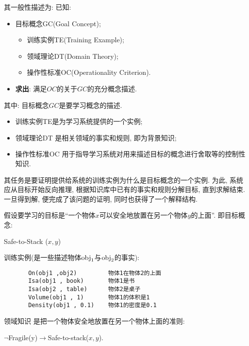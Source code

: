 其一般性描述为: 已知:
\begin{itemize}
\item 目标概念GC(Goal Concept);
   \begin{itemize}
         \item 训练实例TE(Training Example);
         \item 领域理论DT(Domain Theory);
         \item 操作性标准OC(Operationality Criterion).
   \end{itemize}
\item \textbf{求出}: 满足$OC$的关于$GC$的充分概念描述.
\end{itemize}
其中: 目标概念$GC$是要学习概念的描述.

\begin{itemize}
\item 训练实例TE是为学习系统提供的一个实例;
\item 领域理论DT 是相关领域的事实和规则, 即为背景知识;
\item 操作性标准OC 用于指导学习系统对用来描述目标的概念进行舍取等的控制性知识.
\end{itemize}

其任务是要证明提供给系统的训练实例为什么是目标概念的一个实例. 为此, 系统应从目标开始反向推理, 根据知识库中已有的事实和规则分解目标, 直到求解结束. 一旦得到解, 便完成了该问题的证明, 同时也获得了一个解释结构.

\begin{example}
假设要学习的目标是“一个物体$x$可以安全地放置在另一个物体$y$的上面”. 即目标概念:
\begin{center}
  Safe-to-Stack ($x, y$)
\end{center}

训练实例(是一些描述物体$\textup{obj}_1$与$\textup{obj}_2$的事实):
\begin{Verbatim}
       On(obj1 ,obj2)         物体1在物体2的上面
       Isa(obj1 , book)       物体1是书
       Isa(obj2 , table)      物体2是桌子
       Volume(obj1 , 1)       物体1的体积是1
       Density(obj1 , 0.1)    物体1的密度是0.1
\end{Verbatim}

领域知识   是把一个物体安全地放置在另一个物体上面的准则:
\begin{center}
  $\neg $Fragile(y)$\rightarrow$Safe-to-stack($x, y$).
\end{center}
\vspace{-0.4cm}
\end{example}

